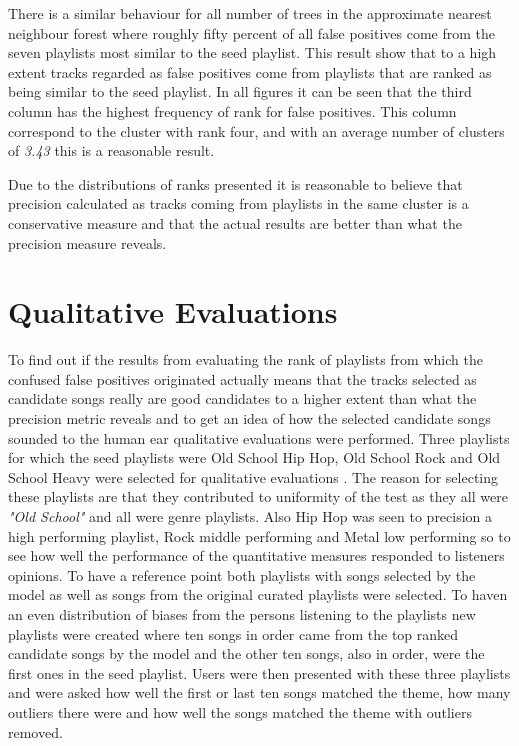 \documentclass[a4paper,11pt]{kth-mag}
\begin{document}
There is a similar behaviour for all number of trees in the approximate nearest neighbour forest where roughly fifty percent of all false positives come from the seven playlists most similar to the seed playlist. This result show that to a high extent tracks regarded as false positives come from playlists that are ranked as being similar to the seed playlist. In all figures it can be seen that the third column has the highest frequency of rank for false positives. This column correspond to the cluster with rank four, and with an average number of clusters of \textit{3.43} this is a reasonable result. 

Due to the distributions of ranks presented it is reasonable to believe that precision calculated as tracks coming from playlists in the same cluster is a conservative measure and that the actual results are better than what the precision measure reveals.

\section{Qualitative Evaluations}
To find out if the results from evaluating the rank of playlists from which the confused false positives originated actually means that the tracks selected as candidate songs really are good candidates to a higher extent than what the precision metric reveals and to get an idea of how the selected candidate songs sounded to the human ear qualitative evaluations were performed. Three playlists for which the seed playlists were Old School Hip Hop, Old School Rock and Old School Heavy were selected for qualitative evaluations
. The reason for selecting these playlists are that they contributed to uniformity of the test as they all were \textit{"Old School"} and all were genre playlists. Also Hip Hop was seen to precision a high performing playlist, Rock middle performing and Metal low performing so to see how well the performance of the quantitative measures responded to listeners opinions. To have a reference point both playlists with songs selected by the model as well as songs from the original curated playlists were selected. To haven an even distribution of biases from the persons listening to the playlists new playlists were created where ten songs in order came from the top ranked candidate songs by the model and the other ten songs, also in order, were the first ones in the seed playlist. Users were then presented with these three playlists and were asked how well the first or last ten songs matched the theme, how many outliers there were and how well the songs matched the theme with outliers removed.
\end{document}
